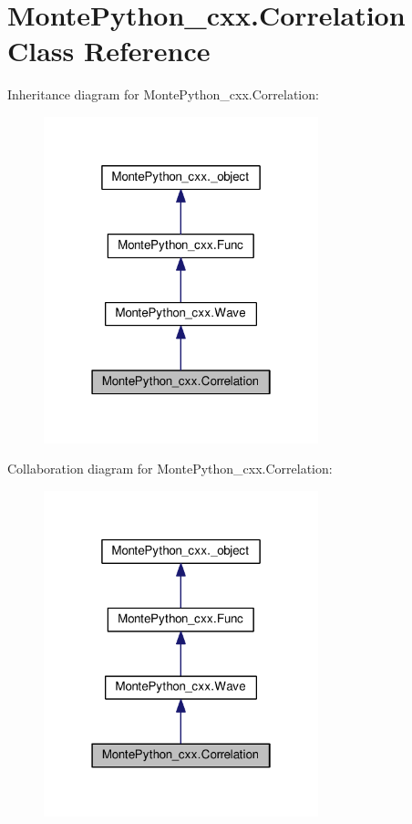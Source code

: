 \hypertarget{classMontePython__cxx_1_1Correlation}{}\section{Monte\+Python\+\_\+cxx.\+Correlation Class Reference}
\label{classMontePython__cxx_1_1Correlation}


Inheritance diagram for Monte\+Python\+\_\+cxx.\+Correlation\+:
\nopagebreak
\begin{figure}[H]
\begin{center}
\leavevmode
\includegraphics[width=226pt]{classMontePython__cxx_1_1Correlation__inherit__graph}
\end{center}
\end{figure}


Collaboration diagram for Monte\+Python\+\_\+cxx.\+Correlation\+:
\nopagebreak
\begin{figure}[H]
\begin{center}
\leavevmode
\includegraphics[width=226pt]{classMontePython__cxx_1_1Correlation__coll__graph}
\end{center}
\end{figure}
